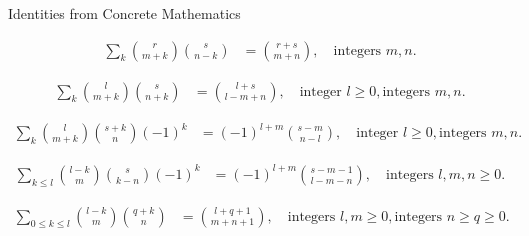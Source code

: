 ﻿Identities from Concrete Mathematics~\cite[p. 169]{graham1994concrete}
\begin{identity}
    \begin{align*}
        \sum_{k} \binom{r}{m+k} \binom{s}{n-k} &= \binom{r+s}{m+n}, \quad \text{integers } m, n.
    \end{align*}
\end{identity}

\begin{identity}
    \begin{align*}
        \sum_{k} \binom{l}{m+k} \binom{s}{n+k} &= \binom{l+s}{l-m+n}, \quad \text{integer } l \geq 0, \text{integers } m, n.
    \end{align*}
\end{identity}

\begin{identity}
    \begin{align*}
        \sum_{k} \binom{l}{m+k} \binom{s+k}{n} (-1)^k &= (-1)^{l+m} \binom{s-m}{n-l}, \quad \text{integer } l \geq 0, \text{integers } m, n.
    \end{align*}
\end{identity}

\begin{identity}
    \begin{align*}
        \sum_{k \leq l} \binom{l-k}{m} \binom{s}{k-n} (-1)^k &= (-1)^{l+m} \binom{s-m-1}{l-m-n}, \quad \text{integers } l, m, n \geq 0.
    \end{align*}
\end{identity}

\begin{identity}
    \begin{align*}
        \sum_{0 \leq k \leq l} \binom{l-k}{m} \binom{q+k}{n} &= \binom{l+q+1}{m+n+1}, \quad \text{integers } l, m \geq 0, \text{integers } n \geq q \geq 0.
    \end{align*}
\end{identity}
